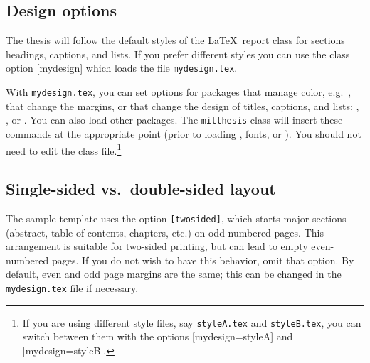 \documentclass[11pt]{article}
\begin{document}
\subsection*{Design options}
The thesis will follow the default styles of the \LaTeX\ report class for sections headings, captions, and lists.  If you prefer different styles you can use the class option [mydesign] which loads the file \texttt{mydesign.tex}.  

With \texttt{mydesign.tex}, you can set options for packages that manage color, e.g.\ \texttt{}, that change the margins, or that change the design of titles, captions, and lists: \texttt{}, \texttt{}, or \texttt{}. You can also load other packages.  The \texttt{mitthesis} class will insert these commands at the appropriate point (prior to loading  \texttt{}, fonts, or  \texttt{}).  You should not need to edit the class file.\footnote{If you are using different style files, say \texttt{styleA.tex} and \texttt{styleB.tex}, you can switch between them with the options [mydesign=styleA] and [mydesign=styleB].}

\subsection*{Single-sided vs.\ double-sided layout}
The sample template uses the option \texttt{[twosided]}, which starts major sections (abstract, table of contents, chapters, etc.) on odd-numbered pages.  This arrangement is suitable for two-sided printing, but can lead to empty even-numbered pages. If you do not wish to have this behavior, omit that option.  By default, even and odd page margins are the same; this can be changed in the \texttt{mydesign.tex} file if necessary.
\end{document}
